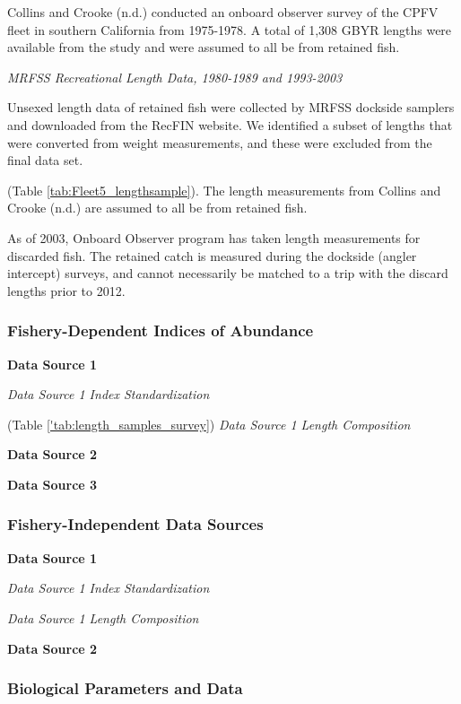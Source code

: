 \documentclass[12pt,]{article}
\begin{document}
Collins and Crooke (n.d.) conducted an onboard observer survey of the
CPFV fleet in southern California from 1975-1978. A total of 1,308 GBYR
lengths were available from the study and were assumed to all be from
retained fish.

\emph{MRFSS Recreational Length Data, 1980-1989 and 1993-2003}

Unsexed length data of retained fish were collected by MRFSS dockside
samplers and downloaded from the RecFIN website. We identified a subset
of lengths that were converted from weight measurements, and these were
excluded from the final data set.

(Table \ref{tab:Fleet5_lengthsample}). The length measurements from
Collins and Crooke (n.d.) are assumed to all be from retained fish.

As of 2003, Onboard Observer program has taken length measurements for
discarded fish. The retained catch is measured during the dockside
(angler intercept) surveys, and cannot necessarily be matched to a trip
with the discard lengths prior to 2012.

\subsubsection{Fishery-Dependent Indices of
Abundance}\label{fishery-dependent-indices-of-abundance}

\textbf{Data Source 1}

\emph{Data Source 1 Index Standardization}

(Table \ref{'tab:length_samples_survey}) \emph{Data Source 1 Length
Composition}

\textbf{Data Source 2}

\textbf{Data Source 3}

\subsubsection{Fishery-Independent Data
Sources}\label{fishery-independent-data-sources}

\textbf{Data Source 1}

\emph{Data Source 1 Index Standardization}

\emph{Data Source 1 Length Composition}

\textbf{Data Source 2}

\subsubsection{Biological Parameters and
Data}\label{biological-parameters-and-data}
\end{document}
